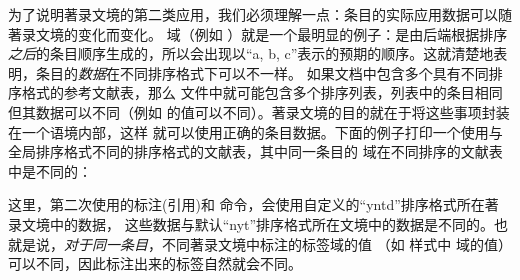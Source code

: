 为了说明著录文境的第二类应用，我们必须理解一点：条目的实际应用数据可以随著录文境的变化而变化。
 域（例如 ）就是一个最明显的例子：是由后端根据排序\emph{之后}的条目顺序生成的，所以会出现以“a, b, c”表示的预期的顺序。这就清楚地表明，条目的\emph{数据}在不同排序格式下可以不一样。
如果文档中包含多个具有不同排序格式的参考文献表，那么  文件中就可能包含多个排序列表，列表中的条目相同但其数据可以不同（例如  的值可以不同）。著录文境的目的就在于将这些事项封装在一个语境内部，这样 \biblatex 就可以使用正确的条目数据。下面的例子打印一个使用与全局排序格式不同的排序格式的文献表，其中同一条目的  域在不同排序的文献表中是不同的：

\begin{ltxexample}
\usepackage[sorting=nyt,style=authoryear]{biblatex}

\cite{one}
\cite{two}
\printbibliography
\newrefcontext[sorting=yntd]
\cite{one}
\cite{two}
\printbibliography
\end{ltxexample}
%
这里，第二次使用的标注(引用)和  命令，会使用自定义的“yntd”排序格式所在著录文境中的数据，
这些数据与默认“nyt”排序格式所在文境中的数据是不同的。也就是说，\emph{对于同一条目}，不同著录文境中标注的标签域的值
（如 样式中  域的值）可以不同，因此标注出来的标签自然就会不同。

